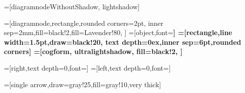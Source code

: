 =[diagramnodeWithoutShadow,
lightshadow]


=[diagramnode,rectangle,rounded corners=2pt,
inner sep=2mm,fill=black!2,fill=Lavender!80,%
]
=[object,font=\diagramfont\bfseries]
=[rectangle,line width=1.5pt,draw=black!20,
text depth=0ex,inner sep=6pt,rounded corners]
=[cogform, ultralightshadow, fill=black!2,
] %

=[right,text depth=0,font=\diagramfont\footnotesize]
=[left,text depth=0,font=\diagramfont\footnotesize]

=[single arrow,draw=gray!25,fill=gray!10,very thick]


